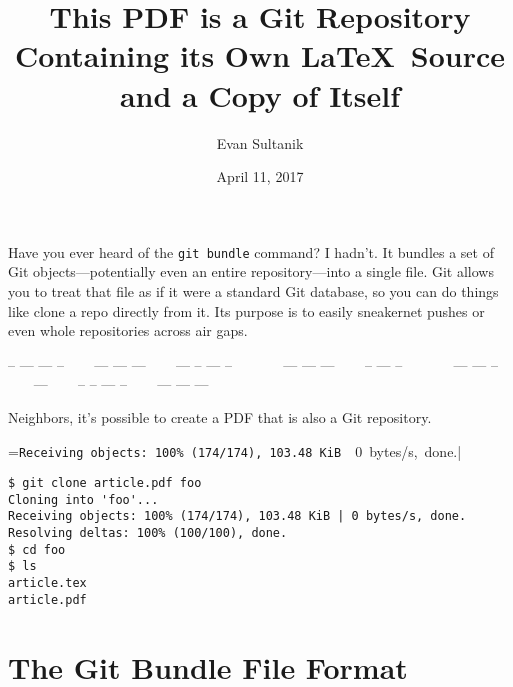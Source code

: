 \documentclass{article}
\def\thindivider{\centerline{\tiny%
-- --- --- -- ~~~ --- --- --- ~~~ --- -- --- -- ~~~~~~
--- --- --- ~~~  -- --- -- ~~~~~~
--- --- -- ~~~ --- ~~~ -- -- --- -- ~~~ --- --- ---}}
\begin{document}
\title{This PDF is a Git Repository\\Containing its Own \LaTeX\ Source\\and a Copy of Itself}
\author{Evan Sultanik}
\date{April 11, 2017}

\maketitle

Have you ever heard of the \texttt{git bundle} command? I hadn't. It
bundles a set of Git objects---potentially even an entire
repository---into a single file. Git allows you to treat that file as
if it were a standard Git database, so you can do things like clone a
repo directly from it. Its purpose is to easily sneakernet pushes or
even whole repositories across air gaps.

\thindivider

Neighbors, it's possible to create a PDF that is also a Git
repository.

\begin{center}
\begingroup
{}=\hbox{\footnotesize\verb|Receiving objects: 100% (174/174), 103.48 KiB | 0 bytes/s, done.|}
\begin{minipage}{\wd9}
\footnotesize\begin{verbatim}
$ git clone article.pdf foo
Cloning into 'foo'...
Receiving objects: 100% (174/174), 103.48 KiB | 0 bytes/s, done.
Resolving deltas: 100% (100/100), done.
$ cd foo
$ ls
article.tex
article.pdf
\end{verbatim}
\end{minipage}
\endgroup
\end{center}

\section{The Git Bundle File Format}
\label{sec:GitBundleFormat}
\end{document}
